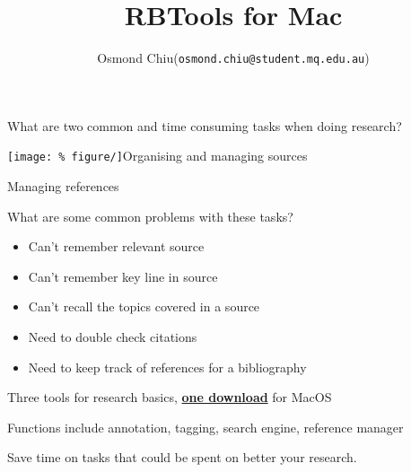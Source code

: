 \documentclass[unknownkeysallowed,usepdftitle=false, parskip=full]{beamer}
\title{RBTools for Mac}
\author{Osmond Chiu\inst (\texttt{osmond.chiu@student.mq.edu.au})}
\institute{Macquarie University}
\newcommand{\secvariable}{nothing}
\newcommand{\mysection}[1]{\renewcommand{\secvariable}{#1}
}
\begin{document}
\mysection{abstract}
\begin{frame}\label{\secvariable}



\parbox{\linewidth}{



\vspace{12pt}

What are two common and time consuming tasks when doing research?

\texttt{[image: \%
figure/]}Organising and managing sources

Managing references

 \vspace{12pt}

What are some common problems with these tasks?
\begin{itemize}
\item Can't remember relevant source
\item Can't remember key line in source
\item Can't recall the topics covered in a source
\item Need to double check citations
\item Need to keep track of references for a bibliography
\end{itemize}

 \vspace{12pt}
 
}


   
\end{frame}

\begin{frame}\label{\secvariable}
    \parbox{\linewidth}{

    
      
      \vspace{12pt}
      
      Three tools for research basics, \href{https://github.com/MQ-FOAR705/Osmond-Chiu---Proof-of-Concept---Implementation.git}{\textbf{one download}} for MacOS
 
      \vspace{12pt}
      
      Functions include annotation, tagging, search engine, reference manager
      
      \vspace{12pt}
 
      Save time on tasks that could be spent on better your research.
      }
      \vspace{12pt}
 
\end{frame}
\end{document}
